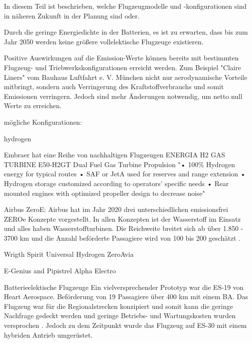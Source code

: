 In diesem Teil ist beschrieben, welche Flugzeugmodelle und -konfigurationen sind in näheren Zukunft in der Planung sind oder.

Durch die geringe Energiedichte in der Batterien, es ist zu erwarten, dass bis zum Jahr 2050 werden keine größere vollelektische Flugzeuge
existieren.

Positive Auswirkungen auf die Emission-Werte können bereits mit bestimmten Flugzeug- und Triebwerkskonfigurationen erreicht werden.
Zum Beispiel "Claire Liners" vom Bauhaus Luftfahrt e. V. München nicht nur aerodynamische Vorteile mitbringt, 
sondern auch Verringerung des Kraftstoffverbrauchs und somit Emissionen verringern.
Jedoch sind mehr Änderungen notwendig, um netto null \cite{CO2} Werte zu erreichen.

mögliche Konfigurationen:

hydrogen

Embraer hat eine Reihe von nachhaltigen Flugzeugen ENERGIA H2 GAS TURBINE E50-H2GT Dual Fuel Gas Turbine Propulsion
"• 100\% Hydrogen energy for typical routes
• SAF or JetA used for reserves and range extension
• Hydrogen storage customized according to operators’ specific
needs
• Rear mounted engines with optimized propeller design to
decrease noise"

Airbus ZeroE: Airbus hat im Jahr 2020 drei unterschiedlichen emissionsfrei ZEROe Konzepte vorgestellt. 
In allen Konzepten ist der Wasserstoff im Einsatz und alles haben Wasserstoffturbinen. Die Reichweite breitet sich ab über 1.850 - 
3700 km und die Anzahl beförderte Passagiere wird von 100 bis 200 geschätzt \cite{airbus_zea_concepts}.

Wrigth Spirit
Universal Hydrogen
ZeroAvia

E-Genius and 
Pipistrel Alpha Electro

Batterieelektische Flugzeuge
Ein vielversprechender Prototyp war die ES-19 von Heart Aerospace. Beförderung von 19 Passagiere über 400 km mit einem BA. 
Das Flugzeug war für die Regionalstrecken konzipiert und somit kann die geringe Nachfrage gedeckt werden und geringe Betriebs- und Wartungskosten wurden versprochen .
Jedoch zu dem Zeitpunkt wurde das Flugzeug auf ES-30 mit einem hybriden Antrieb umgerüstet.
